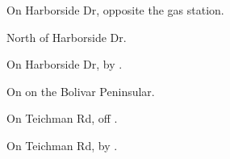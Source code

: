 

\begin{LocationList}

On  Harborside Dr, opposite the gas station.

North of  Harborside Dr.

\Location{\GasStation \Gas \Rest}
On  Harborside Dr, by  .

On  on the Bolivar Peninsular.

On Teichman Rd, off  .

\Location{\TruckService \Service}
On Teichman Rd, by  .

\end{LocationList}
